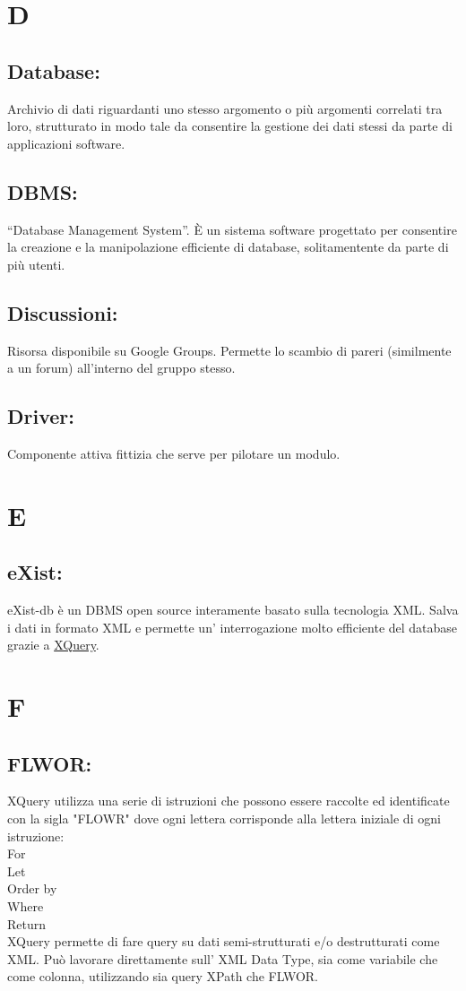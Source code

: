 \chapter{D}
\section{Database:}
Archivio di dati riguardanti uno stesso argomento o pi\`u argomenti correlati tra loro, strutturato in modo tale da consentire la gestione dei dati stessi da parte di applicazioni software.
\section{DBMS:}
``Database Management System''. \`E un sistema software progettato per consentire la creazione e la manipolazione efficiente di database, solitamentente da parte di pi\`u utenti.
\section{Discussioni:}
Risorsa disponibile su Google Groups. Permette lo scambio di pareri (similmente a un forum) all'interno del gruppo stesso.
\section{Driver:}
Componente attiva fittizia che serve per pilotare un modulo.

\chapter{E}
\section{eXist:}
eXist-db \`e un DBMS open source interamente basato sulla tecnologia XML. Salva i dati in formato XML e permette un' interrogazione molto efficiente del database grazie a \hyperlink{XQuery}{XQuery}.

\chapter{F}
\hypertarget{FLWOR}{}
\section{FLWOR:}
XQuery utilizza una serie di istruzioni che possono essere raccolte ed identificate con la sigla "FLOWR" dove ogni lettera corrisponde alla lettera iniziale di ogni istruzione:\\
For \\
Let \\
Order by \\
Where \\
Return \\
XQuery permette di fare query su dati semi-strutturati e/o destrutturati come XML. Pu\`o lavorare direttamente sull' XML Data Type, sia come variabile che come colonna, utilizzando sia query XPath che FLWOR.

